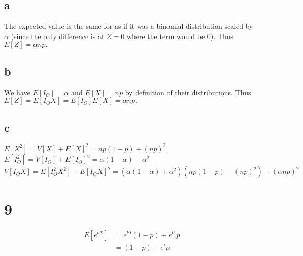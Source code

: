 \documentclass[10pt]{article}
\begin{document}
\subsection*{a}
The expected value is the same for as if it was a binomial distribution scaled by $\alpha$ (since the only difference is at $Z=0$ where the term would be $0$). Thus $E[Z]=\alpha np.$

\subsection*{b}
We have $E[I_O]=\alpha$ and $E[X]=np$ by definition of their distributions. Thus $E[Z]=E[I_OX]=E[I_O]E[X]=\alpha np.$

\subsection*{c}
$E[X^2] = V[X] + E[X]^2 = np(1-p) + (np)^2.$\\
$E[I_O^2] = V[I_O] + E[I_O]^2=\alpha(1-\alpha) + \alpha^2$\\
$V[I_OX] = E[I_O^2X^2] - E[I_OX]^2 = (\alpha(1-\alpha) + \alpha^2)(np(1-p) + (np)^2) - (\alpha np)^2$

\section*{9}
\begin{align*}
    E[e^{tX}] &= e^{t0}(1-p) + e^{t1}p\\
            &= (1-p) + e^{t}p
\end{align*}
\end{document}

